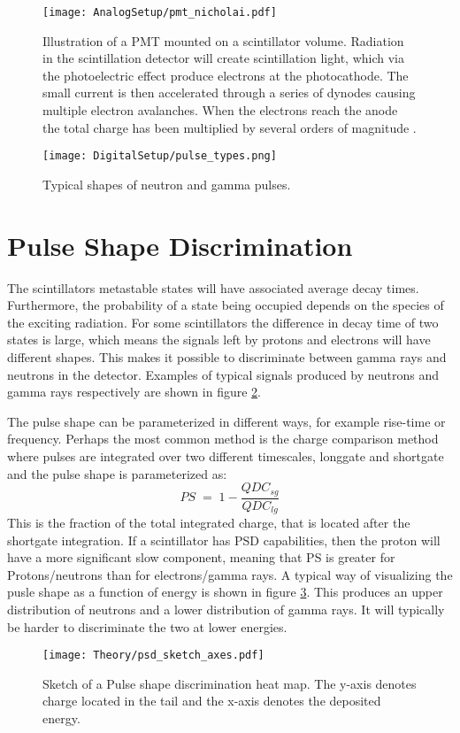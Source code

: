 \documentclass[main.tex]{subfiles}
\begin{document}
\begin{figure}[ht]
	\centering
    	\texttt{[image: AnalogSetup/pmt\_nicholai.pdf]}
        \caption[Illustration of a PMT]{Illustration of a PMT mounted on a scintillator volume. Radiation in the scintillation detector will create scintillation light, which via the photoelectric effect produce electrons at the photocathode. The small current is then accelerated through a series of dynodes causing multiple electron avalanches. When the electrons reach the anode the total charge has been multiplied by several orders of magnitude \cite{Mauritzsson}.}
	    \label{fig:pmt} 
\end{figure}

\begin{figure}[ht]
	\centering
    	\texttt{[image: DigitalSetup/pulse\_types.png]}
        \caption{Typical shapes of neutron and gamma pulses.}
	    \label{fig:pulse_types} 
\end{figure}
\section{Pulse Shape Discrimination}
The scintillators metastable states will have associated average decay times. Furthermore, the probability of a state being occupied depends on the species of the exciting radiation\cite[pg.171]{Krane}. For some scintillators the difference in decay time of two states is large, which means the signals left by protons and electrons will have different shapes. This makes it possible to discriminate between gamma rays and neutrons in the detector. Examples of typical signals produced by neutrons and gamma rays respectively are shown in figure \ref{fig:pulse_types}.

The pulse shape can be parameterized in different ways, for example rise-time or frequency. Perhaps the most common method is the charge comparison method where pulses are integrated over two different timescales, longgate and shortgate and the pulse shape is parameterized as:
\begin{equation}
	PS \; = \; 1-\frac{QDC_{sg}}{QDC_{lg}}
	\label{eq:ps}
\end{equation}
This is the fraction of the total integrated charge, that is located after the shortgate integration. If a scintillator has PSD capabilities, then the proton will have a more significant slow component, meaning that PS is greater for Protons/neutrons than for electrons/gamma rays. A typical way of visualizing the pusle shape as a function of energy is shown in figure \ref{fig:psd_sketch}. This produces an upper distribution of neutrons and a lower distribution of gamma rays. It will typically be harder to discriminate the two at lower energies.
\begin{figure}[ht]
    \centering
        \texttt{[image: Theory/psd\_sketch\_axes.pdf]}
        \caption[Pulse shape discrimination sketch]{Sketch of a Pulse shape discrimination heat map. The y-axis denotes charge located in the tail and the x-axis denotes the deposited energy.}
    \label{fig:psd_sketch} 
\end{figure}
\end{document}

